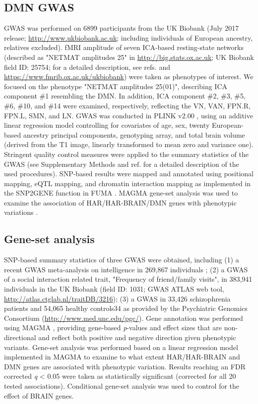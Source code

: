 \begin{refsection}
\subsection*{DMN GWAS}
GWAS was performed on 6899 participants from the UK Biobank (July 2017 release; \url{http://www.ukbiobank.ac.uk}; including individuals of European ancestry, relatives excluded). fMRI amplitude of seven ICA-based resting-state networks (described as "NETMAT amplitudes 25" in \url{http://big.stats.ox.ac.uk}; UK Biobank field ID: 25754; for a detailed description, see refs. \citep{Miller2016MultimodalPB,elliott2018genome} and \url{https://www.fmrib.ox.ac.uk/ukbiobank}) were taken as phenotypes of interest. We focused on the phenotype "NETMAT amplitudes 25(01)", describing ICA component \#1 resembling the DMN. In addition, ICA component \#2, \#3, \#5, \#6, \#10, and \#14 were examined, respectively, reflecting the VN, VAN, FPN.R, FPN.L, SMN, and LN. GWAS was conducted in PLINK v2.00 \citep{Purcell2007PLINKAT}, using an additive linear regression model controlling for covariates of age, sex, twenty European-based ancestry principal components, genotyping array, and total brain volume (derived from the T1 image, linearly transformed to mean zero and variance one). Stringent quality control measures were applied to the summary statistics of the GWAS (see Supplementary Methods and ref. \citep{Savage2018GenomewideAM} for a detailed description of the used procedures). SNP-based results were mapped and annotated using positional mapping, eQTL mapping, and chromatin interaction mapping as implemented in the SNP2GENE function in FUMA \citep{watanabe2017functional}. MAGMA gene-set analysis was used to examine the association of HAR/HAR-BRAIN/DMN genes with phenotypic variations \citep{watanabe2017functional,de2015magma}.

\subsection*{Gene-set analysis}
SNP-based summary statistics of three GWAS were obtained, including (1) a recent GWAS meta-analysis on intelligence in 269,867 individuals \citep{Savage2018GenomewideAM}; (2) a GWAS of a social interaction related trait, "Frequency of friend/family visits", in 383,941 individuals in the UK Biobank \citep{Watanabe2019AGO} (field ID: 1031; GWAS ATLAS web tool, \url{http://atlas.ctglab.nl/traitDB/3216}); (3) a GWAS in 33,426 schizophrenia patients and 54,065 healthy controls34 as provided by the Psychiatric Genomics Consortium (\url{http://www.med.unc.edu/pgc/}). Gene annotation was performed using MAGMA \citep{de2015magma}, providing gene-based \textit{p}-values and effect sizes that are non-directional and reflect both positive and negative direction given phenotypic variants. Gene-set analysis was performed based on a linear regression model implemented in MAGMA \citep{de2015magma} to examine to what extent HAR/HAR-BRAIN and DMN genes are associated with phenotypic variation. Results reaching an FDR corrected \textit{q} < 0.05 were taken as statistically significant (corrected for all 20 tested associations). Conditional gene-set analysis \citep{de2018conditional} was used to control for the effect of BRAIN genes.


\end{refsection}
